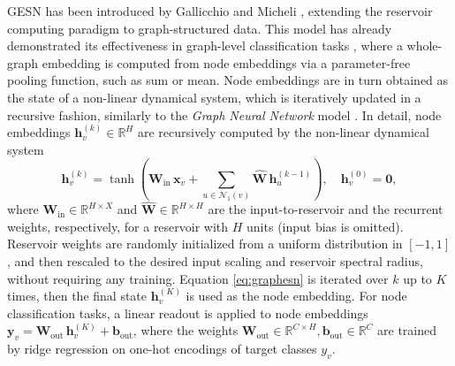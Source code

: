 \documentclass[final,5p,times,twocolumn]{elsarticle}
\begin{document}
GESN has been introduced by Gallicchio and Micheli \cite{Gallicchio2010}, extending the reservoir computing paradigm to graph-structured data.
This model has already demonstrated its effectiveness in graph-level classification tasks \citep{Gallicchio2020}, where a whole-graph embedding is computed from node embeddings via a parameter-free pooling function, such as sum or mean.
Node embeddings are in turn obtained as the state of a non-linear dynamical system, which is iteratively updated in a recursive fashion, similarly to the \textsl{Graph Neural Network} model \cite{Scarselli2009}.
In detail, node embeddings $\mathbf{h}_v^{(k)} \in \mathbb{R}^H$ are recursively computed by the non-linear dynamical system
\begin{equation}\label{eq:graphesn}
	\mathbf{h}_v^{(k)} = \tanh\left(\mathbf{W}_{\mathrm{in}}\, \mathbf{x}_v + \sum_{u \in \mathcal{N}_1(v)} \mathbf{\hat{W}}\, \mathbf{h}_{u}^{(k-1)}\right),\quad \mathbf{h}_v^{(0)} = \mathbf{0},
\end{equation}
where $\mathbf{W}_{\mathrm{in}} \in \mathbb{R}^{H \times X}$ and $\mathbf{\hat{W}} \in \mathbb{R}^{H \times H}$ are the input-to-reservoir and the recurrent weights, respectively, for a reservoir with $H$ units (input bias is omitted).
Reservoir weights are randomly initialized from a uniform distribution in $[-1,1]$, and then rescaled to the desired input scaling and reservoir spectral radius, without requiring any training.
Equation \eqref{eq:graphesn} is iterated over $k$ up to $K$ times, then the final state $\mathbf{h}_v^{(K)}$ is used as the node embedding.
For node classification tasks, a linear readout is applied to node embeddings $\mathbf{y}_v = \mathbf{W}_\mathrm{out}\, \mathbf{h}_v^{(K)} + \mathbf{b}_\mathrm{out}$, where the weights $\mathbf{W}_\mathrm{out} \in \mathbb{R}^{C \times H}, \mathbf{b}_\mathrm{out} \in \mathbb{R}^C$ are trained by ridge regression on one-hot encodings of target classes $y_v$.
\end{document}
